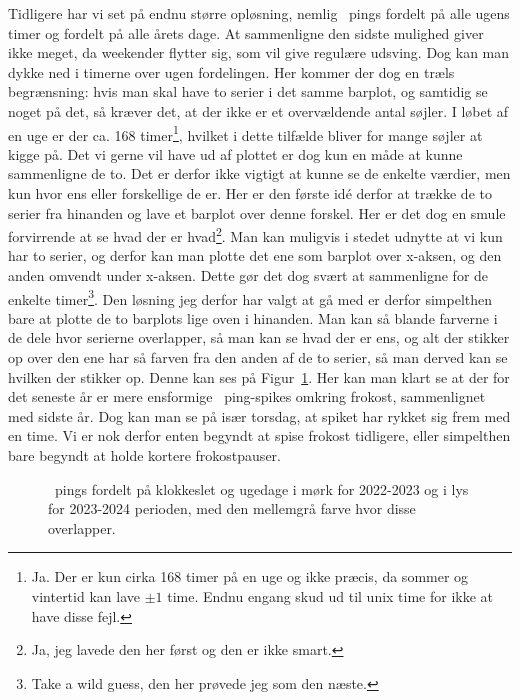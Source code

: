 \begin{article}
Tidligere har vi set på endnu større opløsning, nemlig \coffee\ pings fordelt på alle ugens timer og fordelt på alle årets dage. At sammenligne den sidste mulighed giver ikke meget, da weekender flytter sig, som vil give regulære udsving. Dog kan man dykke ned i timerne over ugen fordelingen.
Her kommer der dog en træls begrænsning: hvis man skal have to serier i det samme barplot, og samtidig se noget på det, så kræver det, at der ikke er et overvældende antal søjler. I løbet af en uge er der ca. 168 timer\footnote{Ja. Der er kun cirka 168 timer på en uge og ikke præcis, da sommer og vintertid kan lave $\pm 1$ time. Endnu engang skud ud til unix time for ikke at have disse fejl.}, hvilket i dette tilfælde bliver for mange søjler at kigge på.
Det vi gerne vil have ud af plottet er dog kun en måde at kunne sammenligne de to. Det er derfor ikke vigtigt at kunne se de enkelte værdier, men kun hvor ens eller forskellige de er. Her er den første idé derfor at trække de to serier fra hinanden og lave et barplot over denne forskel. Her er det dog en smule forvirrende at se hvad der er hvad\footnote{Ja, jeg lavede den her først og den er ikke smart.}. Man kan muligvis i stedet udnytte at vi kun har to serier, og derfor kan man plotte det ene som barplot over x-aksen, og den anden omvendt under x-aksen. Dette gør det dog svært at sammenligne for de enkelte timer\footnote{Take a wild guess, den her prøvede jeg som den næste.}. Den løsning jeg derfor har valgt at gå med er derfor simpelthen bare at plotte de to barplots lige oven i hinanden. Man kan så blande farverne i de dele hvor serierne overlapper, så man kan se hvad der er ens, og alt der stikker op over den ene har så farven fra den anden af de to serier, så man derved kan se hvilken der stikker op. Denne kan ses på Figur~\ref{fig:weekday_analysis_hour_imposed_2022-2023_2023-2024}.
Her kan man klart se at der for det seneste år er mere ensformige \coffee\ ping-spikes omkring frokost, sammenlignet med sidste år. Dog kan man se på især torsdag, at spiket har rykket sig frem med en time. Vi er nok derfor enten begyndt at spise frokost tidligere, eller simpelthen bare begyndt at holde kortere frokostpauser.

\begin{figure}[t!]
	\centering
	\resizebox{2\columnwidth}{!}{}
	\vspace{-10pt}
	\caption{\protect\coffee\ pings fordelt på klokkeslet og ugedage i mørk for 2022-2023 og i lys for 2023-2024 perioden, med den mellemgrå farve hvor disse overlapper.}
	\label{fig:weekday_analysis_hour_imposed_2022-2023_2023-2024}
\end{figure}


\end{article}
